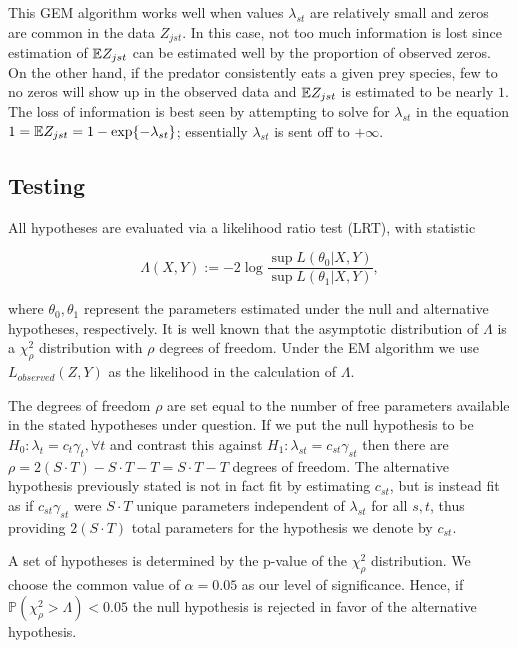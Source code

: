 This GEM algorithm works well when values $\lambda_{st}$ are relatively small and zeros are common in the data $Z_{jst}$.  In this case, not too much information is lost since estimation of $\mathbb{E} Z_{jst}$ can be estimated well by the proportion of observed zeros.  On the other hand, if the predator consistently eats a given prey species, few to no zeros will show up in the observed data and $\mathbb{E} Z_{jst}$ is estimated to be nearly $1$.  The loss of information is best seen by attempting to solve for $\lambda_{st}$ in the equation $1 = \mathbb{E} Z_{jst} = 1 - \exp\{-\lambda_{st}\}$; essentially $\lambda_{st}$ is sent off to $+\infty$. 

\subsection*{Testing}

All hypotheses are evaluated via a likelihood ratio test (LRT), with statistic

\begin{equation*}
  \label{eq:LRT}
    \Lambda(X,Y) := -2 \log{ \frac{ \sup L(\theta_0|X,Y)}{ \sup L(\theta_1|X,Y)} },
\end{equation*}

\noindent where $\theta_0, \theta_1$ represent the parameters estimated under the null and alternative hypotheses, respectively.  It is well known that the asymptotic distribution of $\Lambda$ is a $\chi_{\rho}^2$ distribution with $\rho$ degrees of freedom.  Under the EM algorithm we use $L_{observed}(Z,Y)$ as the likelihood in the calculation of $\Lambda$.  

The degrees of freedom $\rho$ are set equal to the number of free parameters available in the stated hypotheses under question.  If we put the null hypothesis to be $H_0: \lambda_t = c_t \gamma_t, \forall t$ and contrast this against $H_1: \lambda_{st} = c_{st}\gamma_{st}$ then there are $\rho = 2(S \cdot T) - S \cdot T - T = S \cdot T - T$ degrees of freedom.  The alternative hypothesis previously stated is not in fact fit by estimating $c_{st}$, but is instead fit as if $c_{st}\gamma_{st}$ were $S \cdot T$ unique parameters independent of $\lambda_{st}$ for all $s,t$, thus providing $2(S \cdot T)$ total parameters for the hypothesis we denote by $c_{st}$.  

A set of hypotheses is determined by the p-value of the $\chi^2_{\rho}$ distribution.  We choose the common value of $\alpha = 0.05$ as our level of significance.  Hence, if $\mathbb{P}(\chi^2_{\rho} > \Lambda) < 0.05$ the null hypothesis is rejected in favor of the alternative hypothesis.  

